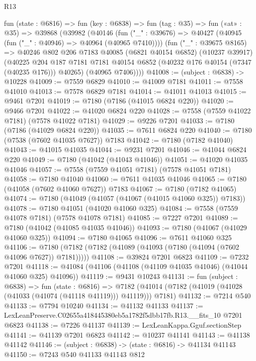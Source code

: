 \begin{lexlean}{R13}
\begin{coremodule}
  fun (state : @6816) =>
  fun (key : @6838) =>
  fun (tag : @35) =>
  fun («at» : @35) =>
  @39868
    (@39982
      (@40146
        (fun ("_" : @39676) => @40427 (@40945 (fun ("_" : @40946) => @40964 (@40965 @7410))))
        (fun ("_" : @39675 @8165) =>
        @40246
          @802
          @206
          @7183
          @40085
          (@6821 @40154 @6852)
          (@10237 @39917)
          (@40225
            @204
            @187
            @7181
            @7181
            @40154
            @6852
            (@40232 @176 @40154 (@7347 (@40235 @176)))
            @40265)
          (@40965 @7406))))
@41008 := (subject : @6838) -> @10228
@41009 := @7559 @6829
@41010 := @41009 @7181
@41011 := @7558 @41010
@41013 := @7578 @6829 @7181
@41014 := @41011 @41013
@41015 := @9461 @7201
@41019 := @7180 (@7186 (@41015 @6824 @220))
@41020 := @9466 @7201
@41022 := @41020 @6824 @220
@41028 := @7558 (@7559 @41022 @7181) (@7578 @41022 @7181)
@41029 := @9226 @7201
@41033 := @7180 (@7186 (@41029 @6824 @220))
@41035 := @7611 @6824 @220
@41040 := @7180 (@7538 (@7602 @41035 @7627)) @7183
@41042 := @7180 (@7182 @41040)
@41043 := @41015 @41035
@41044 := @9231 @7201
@41046 := @41044 @6824 @220
@41049 := @7180 (@41042 (@41043 @41046))
@41051 := @41020 @41035 @41046
@41057 := @7558 (@7559 @41051 @7181) (@7578 @41051 @7181)
@41058 := @7180 @41040
@41060 := @7611 @41035 @41046
@41065 := @7180 (@41058 (@7602 @41060 @7627)) @7183
@41067 := @7180 (@7182 @41065)
@41074 := @7180 (@41049 (@41057 (@41067 (@41015 @41060 @325)) @7183))
@41078 := @7180 @41051 (@41020 @41060 @325)
@41084 := @7558 (@7559 @41078 @7181) (@7578 @41078 @7181)
@41085 := @7227 @7201
@41089 := @7180 (@41042 (@41085 @41035 @41046))
@41093 := @7180 (@41067 (@41029 @41060 @325))
@41094 := @7180 @41065
@41096 := @7611 @41060 @325
@41106 := @7180 (@7182 (@7182 (@41089 (@41093 (@7180 (@41094 (@7602 @41096 @7627)) @7181)))))
@41108 := @39824 @7201 @6823
@41109 := @7232 @7201
@41118 := @41084 (@41106 (@41108 (@41109 @41035 @41046) (@41044 @41060 @325) @41096))
@41119 := @9431 @10243
@41131 := fun (subject : @6838) =>
  fun (state : @6816) =>
  @7182 (@41014 (@7182 (@41019 (@41028 (@41033 (@41074 (@41118 @41119))) @41119))) @7181)
@41132 := @7214 @540
@41133 := @7794 @10240
@41134 := @41132 @41133
@41137 := LexLeanPreserve.C02655a418445380eb5a1782f5dbb17fb.R13.__fits_10 @7201 @6823
@41138 := @7226 @41137
@41139 := LexLeanKappa.Gguf.sectionStep
@41141 := @41139 @7201 @6823
@41142 := @10237 @41141
@41143 := @41138 @41142
@41146 := (subject : @6838) -> (state : @6816) -> @41134 @41143
@41150 := @7243 @540 @41133 @41143 @812

\end{coremodule}
\end{lexlean}
